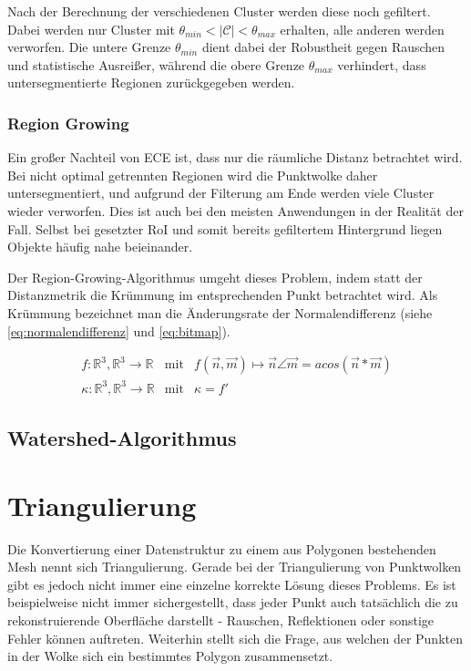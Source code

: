 Nach der Berechnung der verschiedenen Cluster werden diese noch gefiltert.
Dabei werden nur Cluster mit $\theta_{min} < |\mathcal{C}| < \theta_{max}$ erhalten, alle anderen werden verworfen.
Die untere Grenze $\theta_{min}$ dient dabei der Robustheit gegen Rauschen und statistische Ausreißer, während die obere Grenze $\theta_{max}$ verhindert, dass untersegmentierte Regionen zurückgegeben werden.

\subsubsection{Region Growing}
\label{subsubsec:region-growing}

Ein großer Nachteil von \ac{ECE} ist, dass nur die räumliche Distanz betrachtet wird.
Bei nicht optimal getrennten Regionen wird die Punktwolke daher untersegmentiert, und aufgrund der Filterung am Ende werden viele Cluster wieder verworfen.
Dies ist auch bei den meisten Anwendungen in der Realität der Fall.
Selbst bei gesetzter \ac{RoI} und somit bereits gefiltertem Hintergrund liegen Objekte häufig nahe beieinander.

Der Region-Growing-Algorithmus umgeht dieses Problem, indem statt der Distanzmetrik die Krümmung im entsprechenden Punkt betrachtet wird.
Als Krümmung bezeichnet man die Änderungsrate der Normalendifferenz (siehe \autoref{eq:normalendifferenz} und \autoref{eq:bitmap}).

\begin{eqnarray}
\label{eq:normalendifferenz}
f: \mathbb{R}^3, \mathbb{R}^3 \rightarrow \mathbb{R} & \mathrm{mit} & f(\overrightarrow{n}, \overrightarrow{m}) \mapsto \overrightarrow{n} \angle \overrightarrow{m} = acos(\overrightarrow{n} * \overrightarrow{m})\\
\kappa : \mathbb{R}^3, \mathbb{R}^3 \rightarrow \mathbb{R} & \mathrm{mit} & \kappa = f'
\label{eq:kruemmung}
\end{eqnarray}


\subsection{Watershed-Algorithmus}
\label{subsec:watershed}


\section{Triangulierung}
\label{sec:triangulation}

Die Konvertierung einer Datenstruktur zu einem aus Polygonen bestehenden Mesh nennt sich Triangulierung.
Gerade bei der Triangulierung von Punktwolken gibt es jedoch nicht immer eine einzelne korrekte Lösung dieses Problems.
Es ist beispielweise nicht immer sichergestellt, dass jeder Punkt auch tatsächlich die zu rekonstruierende Oberfläche darstellt - Rauschen, Reflektionen oder sonstige Fehler können auftreten.
Weiterhin stellt sich die Frage, aus welchen der Punkten in der Wolke sich ein bestimmtes Polygon zusammensetzt.

